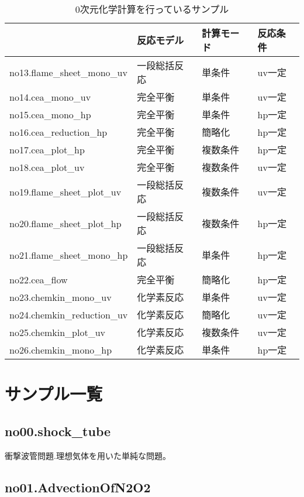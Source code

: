 \documentclass{jsarticle}
\begin{document}
\begin{table}%
\centering
\caption{0次元化学計算を行っているサンプル}
\begin{tabular}{llll}
 & 反応モデル & 計算モード & 反応条件 \\
\hline
no13.flame\_sheet\_mono\_uv       & 一段総括反応 & 単条件   & uv一定 \\
no14.cea\_mono\_uv                & 完全平衡     & 単条件   & uv一定 \\
no15.cea\_mono\_hp                & 完全平衡     & 単条件   & hp一定 \\
no16.cea\_reduction\_hp           & 完全平衡     & 簡略化   & hp一定 \\
no17.cea\_plot\_hp                & 完全平衡     & 複数条件 & hp一定 \\
no18.cea\_plot\_uv                & 完全平衡     & 複数条件 & uv一定 \\
no19.flame\_sheet\_plot\_uv       & 一段総括反応 & 複数条件 & uv一定 \\
no20.flame\_sheet\_plot\_hp       & 一段総括反応 & 複数条件 & hp一定 \\
no21.flame\_sheet\_mono\_hp       & 一段総括反応 & 単条件   & hp一定 \\
no22.cea\_flow                    & 完全平衡     & 簡略化   & hp一定 \\
no23.chemkin\_mono\_uv            & 化学素反応   & 単条件   & uv一定 \\
no24.chemkin\_reduction\_uv       & 化学素反応   & 簡略化   & uv一定 \\
no25.chemkin\_plot\_uv            & 化学素反応   & 複数条件 & uv一定 \\
no26.chemkin\_mono\_hp            & 化学素反応   & 単条件   & hp一定 \\
\hline
\end{tabular}
\end{table}%
\newpage
\hspace{1em}
\newpage
\section{サンプル一覧}

\subsection{no00.shock\_tube}
衝撃波管問題.理想気体を用いた単純な問題。

\subsection{no01.AdvectionOfN2O2}
\end{document}
